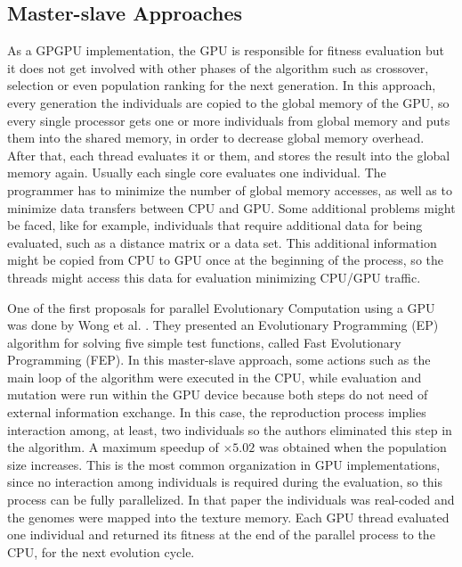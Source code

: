 \documentclass{article}
\begin{document}
\subsection{Master-slave Approaches}
\label{sec:masterSlave}

As a GPGPU implementation, the GPU is responsible for fitness
evaluation but it does not get involved with other phases of the
algorithm such as crossover, selection or even population ranking for
the next generation. In this approach, every generation the
individuals are copied to the global memory of the GPU, so every
single processor gets one or more individuals from global memory and
puts them into the shared memory, in order to decrease global memory
overhead. After that, each thread evaluates it or them, and stores the
result into the global memory again. Usually each single core
evaluates one individual. The programmer has to minimize the number of
global memory accesses, as well as to minimize data transfers between
CPU and GPU. Some additional problems might be faced, like for
example, individuals that require additional data for being evaluated,
such as a distance matrix or a data set. This additional information
might be copied from CPU to GPU once at the beginning of the process,
so the threads might access this data for evaluation minimizing CPU/GPU 
traffic.

One of the first proposals for parallel Evolutionary Computation using
a GPU was done by Wong et
al. \cite{man-leung-wong-parallel-2005}. They presented an
Evolutionary Programming (EP) algorithm %
for solving
five simple test functions, called Fast Evolutionary Programming
(FEP). In this master-slave approach, some actions such as the main loop of the algorithm were executed in
the CPU, while evaluation and mutation were run within the GPU device
because both steps do not need 
of external information exchange. In this case, the reproduction
process implies interaction among, at least, two individuals so the
authors eliminated this step in the algorithm. A maximum speedup of
$\times5.02$ was obtained when the population size increases. This is
the most common organization in GPU implementations, since no
interaction among individuals is required during the evaluation, so
this process can be fully parallelized. In that paper the individuals
was real-coded and the genomes were mapped into the texture
memory. Each GPU thread evaluated one individual and returned its
fitness at the end of the parallel process to the CPU, for the next
evolution cycle. 
\end{document}
